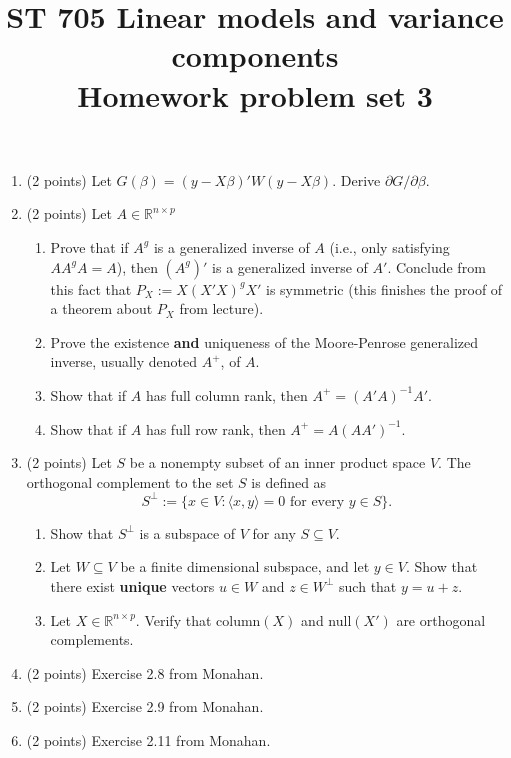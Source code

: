 \documentclass[11pt]{article}
\title{ST 705 Linear models and variance components \\ 
        Homework problem set 3}
\begin{document}
\maketitle

\begin{enumerate}

\item(2 points) Let $G(\beta) = (y - X\beta)'W(y - X\beta)$.  Derive $\partial{G} / \partial{\beta}$.

\item(2 points) Let $A \in \mathbb{R}^{n\times p}$
\begin{enumerate}
\item Prove that if $A^{g}$ is a generalized inverse of $A$ (i.e., only satisfying $AA^{g}A = A$), then $(A^{g})'$ is a generalized inverse of $A'$.  Conclude from this fact that $P_{X} := X(X'X)^{g}X'$ is symmetric (this finishes the proof of a theorem about $P_{X}$ from lecture).
\item Prove the existence \textbf{and} uniqueness of the Moore-Penrose generalized inverse, usually denoted $A^{+}$, of $A$.
\item Show that if $A$ has full column rank, then $A^{+} = (A'A)^{-1}A'$.  
\item Show that if $A$ has full row rank, then $A^{+} = A(AA')^{-1}$.
\end{enumerate}

\item(2 points) Let $S$ be a nonempty subset of an inner product space $V$.  The orthogonal complement to the set $S$ is defined as
\[
S^{\perp} := \{x \in V : \langle x,y\rangle = 0 \text{ for every } y \in S\}.
\]
\begin{enumerate}
\item Show that $S^{\perp}$ is a subspace of $V$ for any $S \subseteq V$.
\item Let $W \subseteq V$ be a finite dimensional subspace, and let $y \in V$.  Show that there exist \textbf{unique} vectors $u \in W$ and $z \in W^{\perp}$ such that $y = u + z$.
\item Let $X \in \mathbb{R}^{n\times p}$.  Verify that column$(X)$ and null$(X')$ are orthogonal complements.
\end{enumerate}

\item(2 points) Exercise 2.8 from Monahan.

\item(2 points) Exercise 2.9 from Monahan.

\item(2 points) Exercise 2.11 from Monahan.


\end{enumerate}
\end{document}
